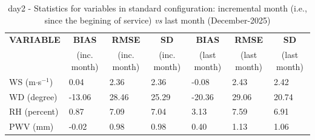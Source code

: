 \begin{table}[h!]
\begin{center}
\begin{tabular}{|l|l|l|l|l|l|l|}
\hline
\multicolumn{1}{|c|}{\cellcolor[HTML]{C0C0C0}\textbf{VARIABLE}} & \multicolumn{1}{c|}{\cellcolor[HTML]{C0C0C0}\textbf{BIAS}} & \multicolumn{1}{c|}{\cellcolor[HTML]{C0C0C0}\textbf{RMSE}} & \multicolumn{1}{c|}{\cellcolor[HTML]{C0C0C0}\textbf{SD}} & \multicolumn{1}{c|}{\cellcolor[HTML]{C0C0C0}\textbf{BIAS}} & \multicolumn{1}{c|}{\cellcolor[HTML]{C0C0C0}\textbf{RMSE}} & \multicolumn{1}{c|}{\cellcolor[HTML]{C0C0C0}\textbf{SD}}\\
\multicolumn{1}{|c|}{\cellcolor[HTML]{C0C0C0}} & \multicolumn{1}{c|}{\cellcolor[HTML]{C0C0C0}(inc. month)} & \multicolumn{1}{c|}{\cellcolor[HTML]{C0C0C0}(inc. month)} & \multicolumn{1}{c|}{\cellcolor[HTML]{C0C0C0}(inc. month)} & \multicolumn{1}{c|}{\cellcolor[HTML]{C0C0C0}(last month)} & \multicolumn{1}{c|}{\cellcolor[HTML]{C0C0C0}(last month)} & \multicolumn{1}{c|}{\cellcolor[HTML]{C0C0C0}(last month)}\\\hline
\cellcolor[HTML]{C0C0C0}WS (m$\cdot$s$^{-1}$) &      0.04  &      2.36  &      2.36  &     -0.08     &      2.43     &      2.42\\
\cellcolor[HTML]{C0C0C0}WD (degree)           &    -13.06  &     28.46  &     25.29  &    -20.36     &     29.06     &     20.74\\
\cellcolor[HTML]{C0C0C0}RH (percent)          &      0.87  &      7.09  &      7.04  &      3.13     &      7.59     &      6.91\\
\cellcolor[HTML]{C0C0C0}PWV (mm)              &     -0.02 &      0.98 &      0.98 &      0.40    &      1.13    &      1.06\\
\hline
\end{tabular}
\caption{day2 - Statistics for variables in standard configuration: incremental month (i.e., since the begining of service) \textit{vs} last month (December-2025)}\label{tab:day2:statBEF}
\end{center}
\end{table}

